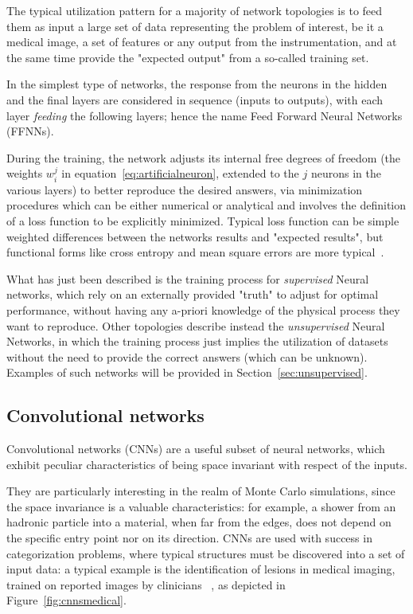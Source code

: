 
The typical utilization pattern for a majority of network topologies is to feed them as input a large set of data representing the problem of interest, be it a medical image, a set of features or any output from the instrumentation, and at the same time provide the "expected output" from a so-called training set. 

In the simplest type of networks, the response from the neurons in the hidden and the final layers are considered in sequence (inputs to outputs), with each layer \emph{feeding} the following layers; hence the name Feed Forward Neural Networks (FFNNs).

During the training, the network adjusts its internal free degrees of freedom (the weights $w_i^j$ in equation~\ref{eq:artificialneuron}, extended to the $j$ neurons in the various layers) to better reproduce the desired answers, via minimization procedures which can be either numerical or analytical and involves the definition of a loss function to be explicitly minimized. Typical loss function can be simple weighted differences between the networks results and "expected results", but functional forms like cross entropy and mean square errors are more typical~\cite{lossfunctions}.

What has just been described is the training process for \emph{supervised} Neural networks, which rely on an externally provided "truth" to adjust for optimal performance, without having any a-priori knowledge of the physical process they want to reproduce.
Other topologies describe instead the \emph{unsupervised} Neural Networks, in which the training process just implies the utilization of datasets without the need to provide the correct answers (which can be unknown). Examples of such networks will be provided in Section~\ref{sec:unsupervised}.

\subsection{Convolutional networks}
Convolutional networks (CNNs) are a useful subset of neural networks, which exhibit peculiar characteristics of being space invariant with respect of the inputs.

They are particularly interesting in the realm of Monte Carlo simulations, since the space invariance is a valuable characteristics: for example, a shower from an hadronic particle into a material, when far from the edges, does not depend on the specific entry point nor on its direction.
CNNs are used with success in categorization problems, where typical structures must be discovered into a set of input data: a typical example is the identification of lesions in medical imaging, trained on reported images by clinicians ~\cite{cnnmedical}, as depicted in Figure~\ref{fig:cnnsmedical}.



